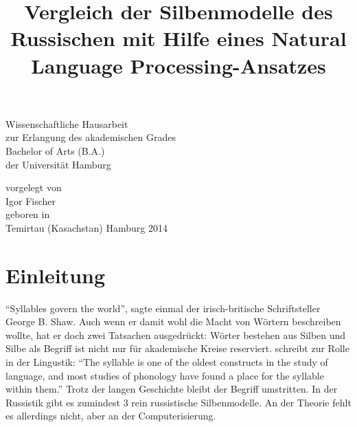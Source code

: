 \documentclass[12pt,headsepline,a4paper]{scrartcl}
\begin{document}
\begin{titlepage}
\date{}
\author{}

 

\title{\Large Vergleich der Silbenmodelle des Russischen mit Hilfe eines Natural Language Processing-Ansatzes}
{\let\newpage\relax\maketitle}


\begin{center}
Wissenschaftliche Hausarbeit\\
zur Erlangung des akademischen Grades\\
Bachelor of Arts (B.A.)\\
der Universität Hamburg
\end{center}
\vfill
\begin{center}
vorgelegt von\\
Igor Fischer\\
geboren in\\
Temirtau (Kasachstan)
\null
\vfill
\noindent
Hamburg 2014
\end{center}

\end{titlepage}

\tableofcontents
\thispagestyle{empty}
% 
% 
% 
% 
\section*{Einleitung}
"`Syllables govern the world"', sagte einmal der irisch-britische Schriftsteller George B. Shaw. Auch wenn er damit wohl die Macht von Wörtern beschreiben wollte, hat er doch zwei Tatsachen ausgedrückt: Wörter bestehen aus Silben und Silbe als Begriff ist nicht nur für akademische Kreise reserviert. \textcite[164]{gold2011} schreibt zur Rolle in der Lingustik: "`The syllable is one of the oldest constructs in the study of language, and most studies of phonology have found a place for the syllable within them."' Trotz der langen Geschichte bleibt der Begriff umstritten. In der Russistik gibt es zumindest 3 rein russistische Silbenmodelle. An der Theorie fehlt es allerdings nicht, aber an der Computerisierung.
\end{document}
